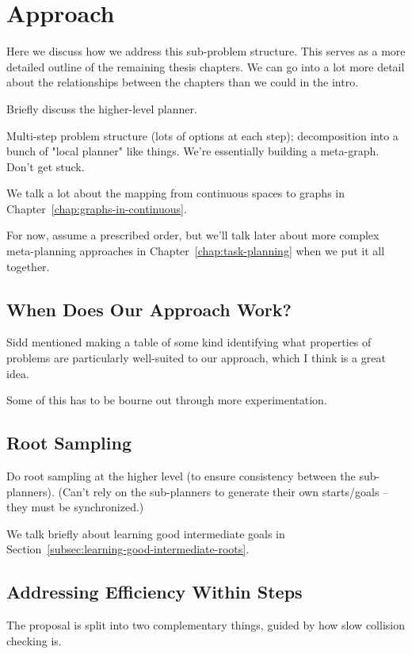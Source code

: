 \section{Approach}
\label{sec:subprobs:approach}

Here we discuss how we address this sub-problem structure.
This serves as a more detailed outline of the remaining
thesis chapters.
We can go into a lot more detail about the relationships
between the chapters than we could in the intro.

Briefly discuss the higher-level planner.

Multi-step problem structure (lots of options at each step);
decomposition into a bunch of "local planner" like things.
We're essentially building a meta-graph.
Don't get stuck.

We talk a lot about the mapping
from continuous spaces to graphs in
Chapter~\ref{chap:graphs-in-continuous}.

For now, assume a prescribed order,
but we'll talk later about more complex meta-planning
approaches
in Chapter~\ref{chap:task-planning}
when we put it all together.

\subsection{When Does Our Approach Work?}

Sidd mentioned making a table of some kind
identifying what properties of problems are particularly
well-suited to our approach,
which I think is a great idea.

Some of this has to be bourne out through more experimentation.

\subsection{Root Sampling}

Do root sampling at the higher level
(to ensure consistency between the sub-planners).
(Can't rely on the sub-planners to generate their own starts/goals --
they must be synchronized.)

We talk briefly about learning good intermediate goals
in Section~\ref{subsec:learning-good-intermediate-roots}.

\subsection{Addressing Efficiency Within Steps}

The proposal is split into two complementary things,
guided by how slow collision checking is.

